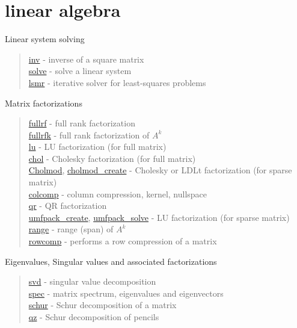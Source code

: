 \chapter*{linear algebra}

Linear system solving
\begin{quote}
\noindent
\hyperlink{inv}{inv} -  inverse of a square matrix  \\
\hyperlink{solve}{solve} - solve a linear system \\
\hyperlink{lsmr}{lsmr} - iterative solver for least-squares problems \\
\end{quote}

Matrix factorizations

\begin{quote}
\noindent
\hyperlink{fullrk}{fullrf} - full rank factorization \\ 
\hyperlink{fullrfk}{fullrfk} - {full rank factorization of $A^k$} \\
\hyperlink{lu}{lu} - LU factorization (for full matrix) \\
\hyperlink{chol}{chol} - Cholesky factorization (for full matrix) \\
\hyperlink{Cholmod}{Cholmod},\;
\hyperlink{cholmod_create}{cholmod\_create} - Cholesky or LDLt factorization (for sparse matrix) \\
\hyperlink{colcomp}{colcomp} - {column compression, kernel, nullspace} \\ 
\hyperlink{qr}{qr} - QR factorization \\ 
\hyperlink{umfpack_create}{umfpack\_create},\;
\hyperlink{umfpack_solve}{umfpack\_solve} - LU factorization (for sparse matrix) \\
\hyperlink{range}{range} - range (span) of $A^k$ \\ 
\hyperlink{rowcomp}{rowcomp} - {performs a row compression of a matrix}
\end{quote}

Eigenvalues, Singular values and associated factorizations

\begin{quote}
\noindent
\hyperlink{svd}{svd} - singular value decomposition \\
\hyperlink{spec}{spec} - matrix spectrum, eigenvalues and eigenvectors\\
\hyperlink{schur}{schur} - Schur decomposition of a matrix \\
\hyperlink{qz}{qz} - Schur decomposition of pencils \\
\end{quote}


